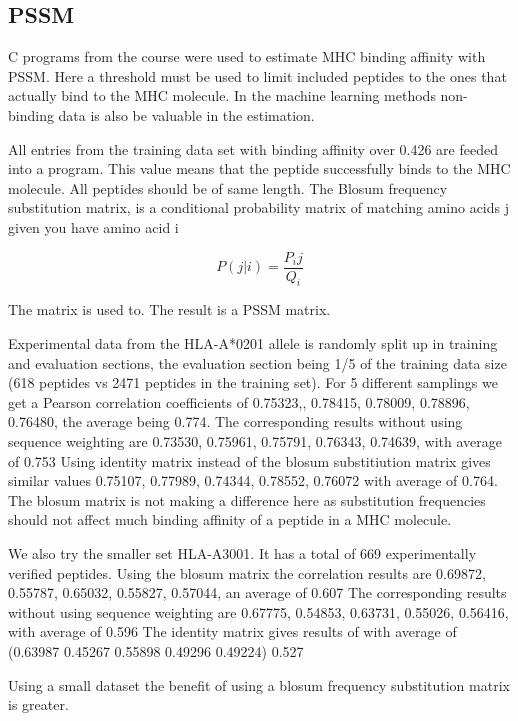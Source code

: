 
\subsection*{PSSM}

C programs from the course were used to estimate MHC binding affinity with PSSM. 
Here a threshold must be used to limit included peptides to the ones that actually bind to the MHC molecule. 
In the machine learning methods non-binding data is also be valuable in the estimation.

All entries from the training data set with binding affinity over 0.426 are feeded into a program. 
This value means that the peptide successfully binds to the MHC molecule. All peptides should be of same length.
The Blosum frequency substitution matrix, is a
conditional probability matrix of matching amino
acids j given you have amino acid i

\begin{equation}
P(j|i) = \frac{P_ij}{Q_i}
\end{equation}

The matrix is used to. The result is a PSSM matrix. 

Experimental data from the HLA-A*0201 allele is randomly split up in training and evaluation sections, the evaluation section being 1/5 of the training data size (618 peptides vs 2471 peptides in the training set).
For 5 different samplings we get a Pearson correlation coefficients of {0.75323,, 0.78415, 0.78009, 0.78896, 0.76480}, the average being 0.774.
The corresponding results without using sequence weighting are {0.73530, 0.75961, 0.75791, 0.76343, 0.74639}, with average of 0.753
Using identity matrix instead of the blosum substitiution matrix gives similar values {0.75107, 0.77989, 0.74344, 0.78552, 0.76072} with average of 0.764.
The blosum matrix is not making a difference here as substitution frequencies should not affect much binding affinity of a peptide in a MHC molecule.

We also try the smaller set HLA-A3001. It has a total of 669 experimentally verified peptides.
Using the blosum matrix the correlation results are {0.69872, 0.55787, 0.65032, 0.55827, 0.57044}, an average of 0.607
The corresponding results without using sequence weighting are {0.67775, 0.54853, 0.63731, 0.55026, 0.56416}, with average of 0.596
The identity matrix gives results of with average of (0.63987 0.45267 0.55898 0.49296 0.49224) 0.527 

Using a small dataset the benefit of using a blosum frequency substitution matrix is greater.

